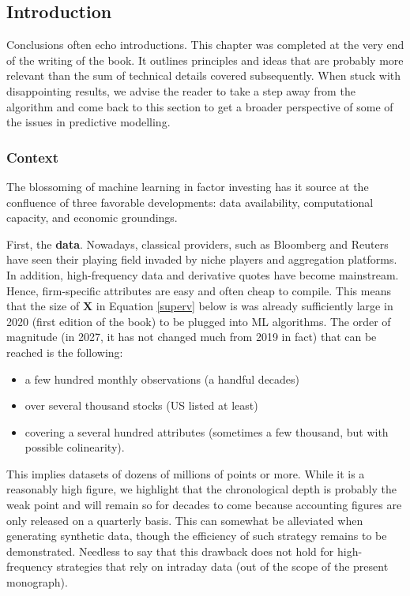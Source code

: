\subsection{Introduction}

Conclusions often echo introductions. This chapter was completed at the very end of the writing of the book. It outlines principles and ideas that are probably more relevant than the sum of technical details covered subsequently. When stuck with disappointing results, we advise the reader to take a step away from the algorithm and come back to this section to get a broader perspective of some of the issues in predictive modelling.

\subsubsection{Context}

The blossoming of machine learning in factor investing has it source at the confluence of three favorable developments: data availability, computational capacity, and economic groundings.

First, the \textbf{data}. Nowadays, classical providers, such as Bloomberg and Reuters have seen their playing field invaded by niche players and aggregation platforms. In addition, high-frequency data and derivative quotes have become mainstream. Hence, firm-specific attributes are easy and often cheap to compile. This means that the size of $\mathbf{X}$ in Equation \ref{superv} below is was already sufficiently large in 2020 (first edition of the book) to be plugged into ML algorithms. The order of magnitude (in 2027, it has not changed much from 2019 in fact) that can be reached is the following:

\begin{itemize}
\item a few hundred monthly observations (a handful decades)
\item over several thousand stocks (US listed at least)
\item covering a several hundred attributes (sometimes a few thousand, but with possible colinearity).
\end{itemize}

This implies datasets of dozens of millions of points or more. While it is a reasonably high figure, we highlight that the chronological depth is probably the weak point and will remain so for decades to come because accounting figures are only released on a quarterly basis. This can somewhat be alleviated when generating synthetic data, though the efficiency of such strategy remains to be demonstrated. Needless to say that this drawback does not hold for high-frequency strategies that rely on intraday data (out of the scope of the present monograph).

